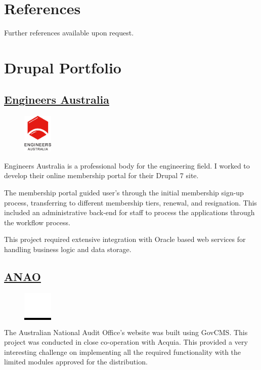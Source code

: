 \documentclass[11pt,a4paper,sans]{moderncv}        %
\begin{document}
\section{References}
  Further references available upon request.

\clearpage
\section{Drupal Portfolio}
  \subsection{\href{https://www.engineersaustralia.org.au/}{Engineers Australia}}
    \begin{figure}
      \vspace{-10pt}
      \includegraphics[width=0.125\textwidth]{EA_logo}
      \vspace{-20pt}
    \end{figure}
    Engineers Australia is a professional body for the engineering field. I worked to develop their online membership portal for their Drupal 7 site.
    
    The membership portal guided user's through the initial membership sign-up process, transferring to different membership tiers, renewal, and resignation. This included an administrative back-end for staff to process the applications through the workflow process.

    This project required extensive integration with Oracle based web services for handling business logic and data storage.

  \subsection{\href{https://www.anao.gov.au/}{\ac{ANAO}}}
    \begin{figure}
      \vspace{-15pt}
      \colorbox{black}{\includegraphics[width=0.125\textwidth]{ANAO_logo}}
      \vspace{-25pt}
    \end{figure}
    The Australian National Audit Office's website was built using GovCMS\@. This project was conducted in close co-operation with Acquia. This provided a very interesting challenge on implementing all the required functionality with the limited modules approved for the distribution.
\end{document}
